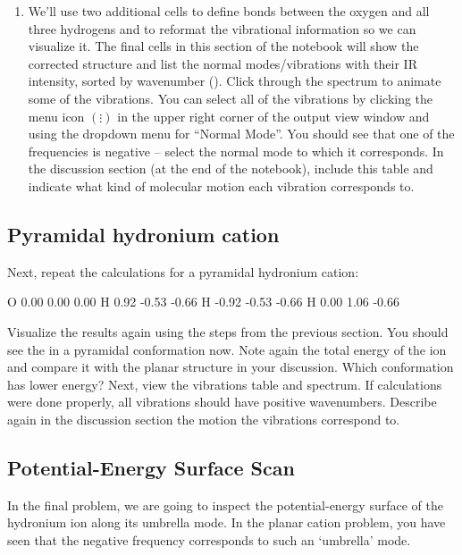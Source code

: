 \begin{enumerate}
  \item   We'll use two additional cells to define bonds between the oxygen and all three hydrogens and to reformat the vibrational information so we can visualize it. 
  The final cells in this section of the notebook will show the corrected structure and list the normal modes/vibrations with their IR intensity, sorted by wavenumber (\unit{\wn}). 
  Click through the spectrum to animate some of the vibrations. 
  You can select all of the vibrations by clicking the menu icon \( (\vdots) \) in the upper right corner of the output view window and using the dropdown menu for ``Normal Mode''. 
  You should see that one of the frequencies is negative -- select the normal mode to which it corresponds. 
  In the discussion section (at the end of the notebook), include this table and indicate what kind of molecular motion each vibration corresponds to. 

\end{enumerate}


\subsection*{Pyramidal hydronium cation}

Next, repeat the calculations for a pyramidal hydronium cation: 
\begin{gaussinput}[title=Contents of \Verb{geom_pyramidal.xyz}]
O    0.00   0.00   0.00 
H    0.92  -0.53  -0.66 
H   -0.92  -0.53  -0.66 
H    0.00   1.06  -0.66 

\end{gaussinput}
Visualize the results again using the steps from the previous section. 
You should see the  in a pyramidal conformation now.  
Note again the total energy of the ion and compare it with the planar structure in your discussion. 
Which conformation has lower energy? 
Next, view the vibrations table and spectrum. 
If calculations were done properly, all vibrations should have positive wavenumbers. 
Describe again in the discussion section the motion the vibrations correspond to. 


\subsection*{Potential-Energy Surface Scan}

In the final problem, we are going to inspect the potential-energy surface of the hydronium ion along its umbrella mode. In the planar cation problem, you have seen that the negative frequency corresponds to such an `umbrella' mode. 

